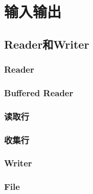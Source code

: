 \chapter{输入输出}\label{ch18}

\section{Reader和Writer}

\subsection{Reader}

\subsection{Buffered Reader}

\subsection{读取行}

\subsection{收集行}

\subsection{Writer}

\subsection{File}\label{file}